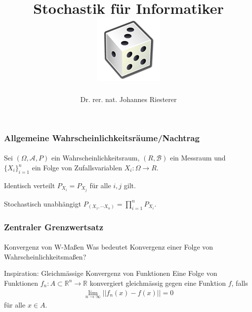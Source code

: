 \documentclass{beamer}
\begin{document}
\title[Stochastik] %
{Stochastik für Informatiker
\\
\includegraphics[scale=0.5]{img/craps}
}
\subtitle{}
\author[Dr. Johannes Riesterer] %
{Dr.  rer. nat. Johannes Riesterer}

\date[KPT 2004] %
{}

\subject{Stochastik}

\frame{\titlepage}


\begin{frame}
    \frametitle{Allgemeine Wahrscheinlichkeitsräume/Nachtrag}
\framesubtitle{}

\begin{block}{}
Sei $(\Omega, \mathcal{A}, P)$ ein Wahrscheinlichkeitsraum, $(R, \mathcal{B})$ ein Messraum  und
 $\{X_i\}_{i=1}^n$ ein Folge von Zufallsvariablen   $X_i :  \Omega \to R$.
\end{block}
\begin{block}{Identisch verteilt}
 $P_{X_i} = P_{X_j}$ für alle $i,j$ gilt.
\end{block}
\begin{block}{Stochastisch unabhängigt}
 $P_{(X_1, \cdots X_n)} = \prod_{i=1}^n P_{X_i}$. 
\end{block}

 \end{frame}



\begin{frame}
    \frametitle{Zentraler Grenzwertsatz}
\framesubtitle{}

\begin{block}{Konvergenz von W-Maßen}
Was bedeutet Konvergenz einer Folge von Wahrscheinlichkeitsmaßen?
\end{block}
\begin{block}{Inspiration: Gleichmässige Konvergenz von Funktionen}
Eine Folge von Funktionen $f_n: A \subset \mathbb{R}^n \to \mathbb{R}$ konvergiert gleichmässig gegen eine Funktion $f$, falls 
\begin{align*}
\lim_{n \to \infty} ||f_n(x) -f(x) || = 0
\end{align*}
für alle $x \in A$.
\end{block}

 \end{frame}
\end{document}
